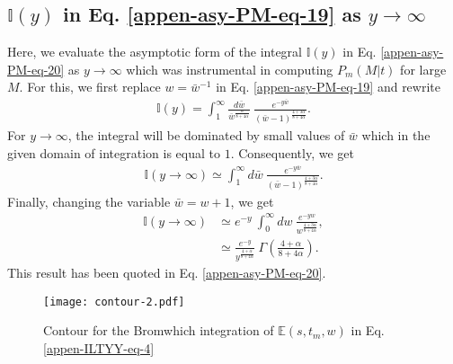 \documentclass[superscriptaddress,amsmath,amssymb,aps,onecolumn]{revtex4}
\begin{document}
\subsection{$\mathbb{I}(y)$ in Eq. \eqref{appen-asy-PM-eq-19} as $y \to \infty$}
\label{appen-IIa}
Here, we evaluate the asymptotic form of the integral $\mathbb{I}(y)$ in Eq. \eqref{appen-asy-PM-eq-20} as $y \to \infty$ which was instrumental in computing $P_m(M|t)$ for large $M$. For this, we  first replace $w=\bar{w}^{-1}$ in Eq. \eqref{appen-asy-PM-eq-19} and rewrite
\begin{align}
\mathbb{I}(y) = \int _{1}^{\infty} \frac{d \bar{w}}{\bar{w}^{\frac{\alpha}{8+4 \alpha}}}~\frac{e^{-y \bar{w}}}{\left( \bar{w}-1 \right)^{\frac{4+3 \alpha}{8+4 \alpha}}}.
\label{appen-asy-PM-eq-22}
\end{align}
For $y \to \infty$, the integral will be dominated by small values of $\bar{w}$ which in the given domain of integration is equal to $1$. Consequently, we get
\begin{align}
\mathbb{I} \left( y \to \infty \right) \simeq \int _{1}^{\infty} d \bar{w}~\frac{e^{-y \bar{w}}}{\left( \bar{w}-1 \right)^{\frac{4+3 \alpha}{8+4 \alpha}}}.
\label{appen-asy-PM-eq-23}
\end{align}
Finally, changing the variable $\bar{w}=w+1 $, we get
\begin{align}
\mathbb{I} \left( y \to \infty \right) &\simeq e^{-y}~\int _{0}^{\infty} d w~\frac{e^{-y w}}{w^{\frac{4+3 \alpha}{8+4 \alpha}}}, 
\\
& \simeq \frac{e^{-y}}{y^{\frac{4+\alpha}{8+4 \alpha}}}~\Gamma \left(\frac{4+\alpha}{8+4 \alpha} \right).
\label{appen-asy-PM-eq-23}
\end{align}
This result has been quoted in Eq. \eqref{appen-asy-PM-eq-20}.

\begin{figure}[t]
\texttt{[image: contour-2.pdf]}
\centering
\caption{Contour for the Bromwhich integration of $\mathbb{E}(s,t_m,w) $ in Eq. \eqref{appen-ILTYY-eq-4}}
\label{contour-fig-2}
\end{figure}
\end{document}
